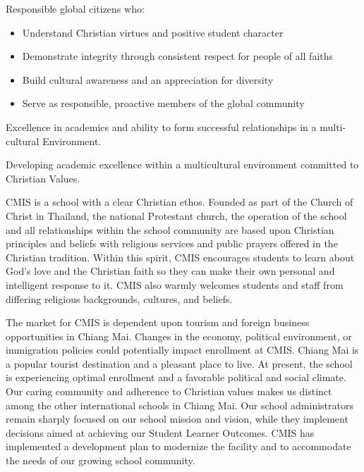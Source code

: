 Responsible global citizens who:
\begin{itemize}
\item Understand Christian virtues and positive student character
\item Demonstrate integrity through consistent respect for people of all faiths
\item Build cultural awareness and an appreciation for diversity
\item Serve as responsible, proactive members of the global community
\end{itemize}


Excellence in academics and ability to form successful relationships in a multi-cultural Environment.

 
Developing academic excellence within a multicultural environment committed to Christian Values.


CMIS is a school with a clear Christian ethos.  Founded as part of the Church of Christ in Thailand, the national Protestant church, the operation of the school and all relationships within the school community are based upon Christian principles and beliefs with religious services and public prayers offered in the Christian tradition.  Within this spirit, CMIS encourages students to learn about God’s love and the Christian faith so they can make their own personal and intelligent response to it.  CMIS also warmly welcomes students and staff from differing religious backgrounds, cultures, and beliefs.



The market for CMIS is dependent upon tourism and foreign business opportunities in Chiang Mai.  Changes in the economy, political environment, or immigration policies could potentially impact enrollment at CMIS.  Chiang Mai is a popular tourist destination and a pleasant place to live.  At present, the school is experiencing optimal enrollment and a favorable political and social climate.  Our caring community and adherence to Christian values makes us distinct among the other international schools in Chiang Mai.  Our school administrators remain sharply focused on our school mission and vision, while they implement decisions aimed at achieving our Student Learner Outcomes.  CMIS has implemented a development plan to modernize the facility and to accommodate the needs of our growing school community.  

